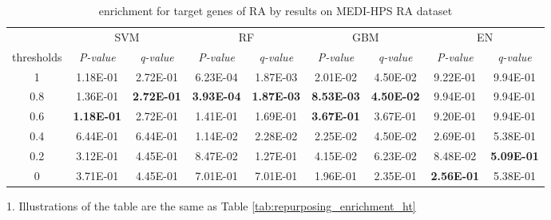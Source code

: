         \begin{table}[htbp]
          \centering
          \caption{enrichment for target genes of RA by results on MEDI-HPS RA dataset}
          \begin{threeparttable}
            \tabcolsep=0.10cm
            \begin{tabular}{ccccccccc}
              \toprule
                  & \multicolumn{2}{c}{SVM} & \multicolumn{2}{c}{RF} & \multicolumn{2}{c}{GBM} & \multicolumn{2}{c}{EN} \\
            thresholds & \textit{P-value} & \textit{q-value} & \textit{P-value} & \textit{q-value} & \textit{P-value} & \textit{q-value} & \textit{P-value} & \textit{q-value} \\
            \midrule
            1     & 1.18E-01 & 2.72E-01 & 6.23E-04 & 1.87E-03 & 2.01E-02 & 4.50E-02 & 9.22E-01 & 9.94E-01 \\
            0.8   & 1.36E-01 & \textbf{2.72E-01} & \textbf{3.93E-04} & \textbf{1.87E-03} & \textbf{8.53E-03} & \textbf{4.50E-02} & 9.94E-01 & 9.94E-01 \\
            0.6   & \textbf{1.18E-01} & 2.72E-01 & 1.41E-01 & 1.69E-01 & \textbf{3.67E-01} & 3.67E-01 & 9.20E-01 & 9.94E-01 \\
            0.4   & 6.44E-01 & 6.44E-01 & 1.14E-02 & 2.28E-02 & 2.25E-02 & 4.50E-02 & 2.69E-01 & 5.38E-01 \\
            0.2   & 3.12E-01 & 4.45E-01 & 8.47E-02 & 1.27E-01 & 4.15E-02 & 6.23E-02 & 8.48E-02 & \textbf{5.09E-01} \\
            0     & 3.71E-01 & 4.45E-01 & 7.01E-01 & 7.01E-01 & 1.96E-01 & 2.35E-01 & \textbf{2.56E-01} & 5.38E-01 \\
            \bottomrule
            \end{tabular}%
            \begin{tablenotes}
              \item 1. Illustrations of the table are the same as Table \ref{tab:repurposing_enrichment_ht}
            \end{tablenotes}
          \end{threeparttable}
          \label{tab:repurposing_enrichment_ra}%
        \end{table}%

